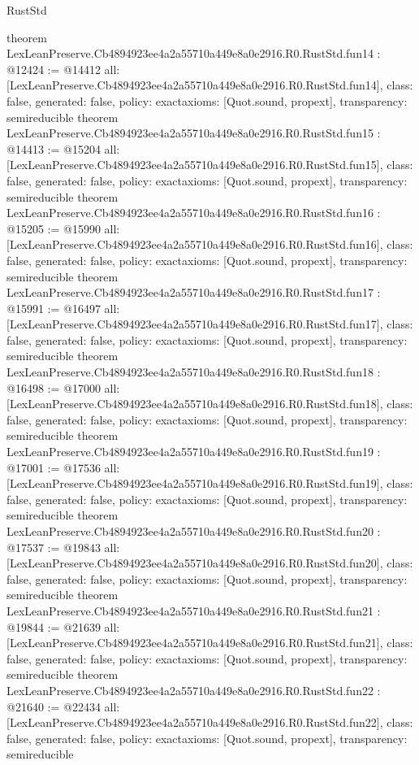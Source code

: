 \begin{lexlean}{RustStd}
\begin{coremodule}
{}
theorem LexLeanPreserve.Cb4894923ee4a2a55710a449e8a0e2916.R0.RustStd.fun14 : @12424 := @14412 {
  all: [LexLeanPreserve.Cb4894923ee4a2a55710a449e8a0e2916.R0.RustStd.fun14],
  class: false,
  generated: false,
  policy: exact{axioms: [Quot.sound, propext]},
  transparency: semireducible
}
theorem LexLeanPreserve.Cb4894923ee4a2a55710a449e8a0e2916.R0.RustStd.fun15 : @14413 := @15204 {
  all: [LexLeanPreserve.Cb4894923ee4a2a55710a449e8a0e2916.R0.RustStd.fun15],
  class: false,
  generated: false,
  policy: exact{axioms: [Quot.sound, propext]},
  transparency: semireducible
}
theorem LexLeanPreserve.Cb4894923ee4a2a55710a449e8a0e2916.R0.RustStd.fun16 : @15205 := @15990 {
  all: [LexLeanPreserve.Cb4894923ee4a2a55710a449e8a0e2916.R0.RustStd.fun16],
  class: false,
  generated: false,
  policy: exact{axioms: [Quot.sound, propext]},
  transparency: semireducible
}
theorem LexLeanPreserve.Cb4894923ee4a2a55710a449e8a0e2916.R0.RustStd.fun17 : @15991 := @16497 {
  all: [LexLeanPreserve.Cb4894923ee4a2a55710a449e8a0e2916.R0.RustStd.fun17],
  class: false,
  generated: false,
  policy: exact{axioms: [Quot.sound, propext]},
  transparency: semireducible
}
theorem LexLeanPreserve.Cb4894923ee4a2a55710a449e8a0e2916.R0.RustStd.fun18 : @16498 := @17000 {
  all: [LexLeanPreserve.Cb4894923ee4a2a55710a449e8a0e2916.R0.RustStd.fun18],
  class: false,
  generated: false,
  policy: exact{axioms: [Quot.sound, propext]},
  transparency: semireducible
}
theorem LexLeanPreserve.Cb4894923ee4a2a55710a449e8a0e2916.R0.RustStd.fun19 : @17001 := @17536 {
  all: [LexLeanPreserve.Cb4894923ee4a2a55710a449e8a0e2916.R0.RustStd.fun19],
  class: false,
  generated: false,
  policy: exact{axioms: [Quot.sound, propext]},
  transparency: semireducible
}
theorem LexLeanPreserve.Cb4894923ee4a2a55710a449e8a0e2916.R0.RustStd.fun20 : @17537 := @19843 {
  all: [LexLeanPreserve.Cb4894923ee4a2a55710a449e8a0e2916.R0.RustStd.fun20],
  class: false,
  generated: false,
  policy: exact{axioms: [Quot.sound, propext]},
  transparency: semireducible
}
theorem LexLeanPreserve.Cb4894923ee4a2a55710a449e8a0e2916.R0.RustStd.fun21 : @19844 := @21639 {
  all: [LexLeanPreserve.Cb4894923ee4a2a55710a449e8a0e2916.R0.RustStd.fun21],
  class: false,
  generated: false,
  policy: exact{axioms: [Quot.sound, propext]},
  transparency: semireducible
}
theorem LexLeanPreserve.Cb4894923ee4a2a55710a449e8a0e2916.R0.RustStd.fun22 : @21640 := @22434 {
  all: [LexLeanPreserve.Cb4894923ee4a2a55710a449e8a0e2916.R0.RustStd.fun22],
  class: false,
  generated: false,
  policy: exact{axioms: [Quot.sound, propext]},
  transparency: semireducible
}
\end{coremodule}
\end{lexlean}
